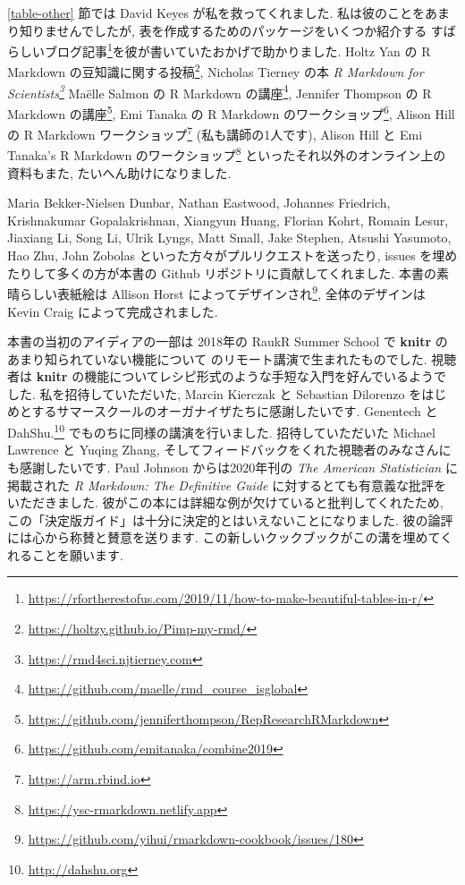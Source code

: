 \documentclass[
  11pt,
  lualatex,ja=standard,jafont=noto]{bxjsreport}
\renewcommand{\href}[2]{#2\footnote{\url{#1}}}
\begin{document}
\ref{table-other} 節では David Keyes が私を救ってくれました. 私は彼のことをあまり知りませんでしたが, 表を作成するためのパッケージをいくつか紹介する \href{https://rfortherestofus.com/2019/11/how-to-make-beautiful-tables-in-r/}{すばらしいブログ記事}を彼が書いていたおかげで助かりました. Holtz Yan の \href{https://holtzy.github.io/Pimp-my-rmd/}{R Markdown の豆知識に関する投稿}, Nicholas Tierney の本 \emph{\href{https://rmd4sci.njtierney.com}{R Markdown for Scientists}} Maëlle Salmon の \href{https://github.com/maelle/rmd_course_isglobal}{R Markdown の講座}, Jennifer Thompson の \href{https://github.com/jenniferthompson/RepResearchRMarkdown}{R Markdown の講座}, Emi Tanaka の \href{https://github.com/emitanaka/combine2019}{R Markdown のワークショップ}, Alison Hill の \href{https://arm.rbind.io}{R Markdown ワークショップ} (私も講師の1人です), Alison Hill と Emi Tanaka's \href{https://ysc-rmarkdown.netlify.app}{R Markdown のワークショップ} といったそれ以外のオンライン上の資料もまた, たいへん助けになりました.

Maria Bekker-Nielsen Dunbar, Nathan Eastwood, Johannes Friedrich, Krishnakumar Gopalakrishnan, Xiangyun Huang, Florian Kohrt, Romain Lesur, Jiaxiang Li, Song Li, Ulrik Lyngs, Matt Small, Jake Stephen, Atsushi Yasumoto, Hao Zhu, John Zobolas といった方々がプルリクエストを送ったり, issues を埋めたりして多くの方が本書の Github リポジトリに貢献してくれました. 本書の素晴らしい表紙絵は \href{https://github.com/yihui/rmarkdown-cookbook/issues/180}{Allison Horst によってデザインされ}, 全体のデザインは Kevin Craig によって完成されました.

本書の当初のアイディアの一部は 2018年の RaukR Summer School で \textbf{knitr} のあまり知られていない機能について のリモート講演で生まれたものでした. 視聴者は \textbf{knitr} の機能についてレシピ形式のような手短な入門を好んでいるようでした. 私を招待していただいた, Marcin Kierczak と Sebastian Dilorenzo をはじめとするサマースクールのオーガナイザたちに感謝したいです. Genentech と \href{http://dahshu.org}{DahShu.} でものちに同様の講演を行いました. 招待していただいた Michael Lawrence と Yuqing Zhang, そしてフィードバックをくれた視聴者のみなさんにも感謝したいです. Paul Johnson からは2020年刊の \emph{The American Statistician} に掲載された \emph{R Markdown: The Definitive Guide} に対するとても有意義な批評をいただきました. 彼がこの本には詳細な例が欠けていると批判してくれたため, この「決定版ガイド」は十分に決定的とはいえないことになりました. 彼の論評には心から称賛と賛意を送ります. この新しいクックブックがこの溝を埋めてくれることを願います.
\end{document}
